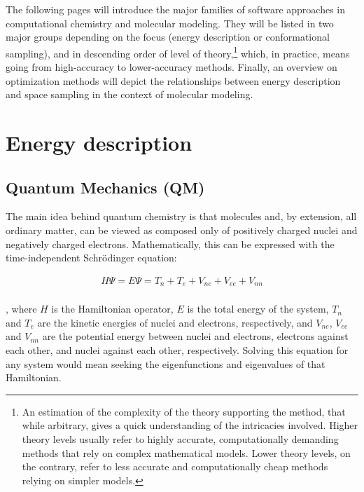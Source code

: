 The following pages will introduce the major families of software approaches in computational chemistry and molecular modeling. They will be listed in two major groups depending on the focus (energy description or conformational sampling), and in descending order of level of theory,\footnote{An estimation of the complexity of the theory supporting the method, that while arbitrary, gives a quick understanding of the intricacies involved. Higher theory levels usually refer to highly accurate, computationally demanding methods that rely on complex mathematical models. Lower theory levels, on the contrary, refer to less accurate and computationally cheap methods relying on simpler models.} which, in practice, means going from high-accuracy to lower-accuracy methods. Finally, an overview on optimization methods will depict the relationships between energy description and space sampling in the context of molecular modeling.


\section{Energy description}
\subsection{Quantum Mechanics (QM)}
\label{section:qm}

The main idea behind quantum chemistry is that molecules and, by extension, all ordinary matter, can be viewed as composed only of positively charged nuclei and negatively charged electrons. Mathematically, this can be expressed with the time-independent Schrödinger equation:

\begin{align}
	H \Psi =E \Psi =T_{n}+T_{e}+V_{ne}+V_{ee}+V_{nn} \\ \tag{Time-independent Schrödinger's equation}
\end{align}

, where $H$ is the Hamiltonian operator, $E$ is the total energy of the system, $T_{n}$ and $T_{e}$ are the kinetic energies of nuclei and electrons, respectively, and $V_{ne}$, $V_{ee}$ and $V_{nn}$ are the potential energy between nuclei and electrons, electrons against each other, and nuclei against each other, respectively. Solving this equation for any system would mean seeking the eigenfunctions and eigenvalues of that Hamiltonian.

